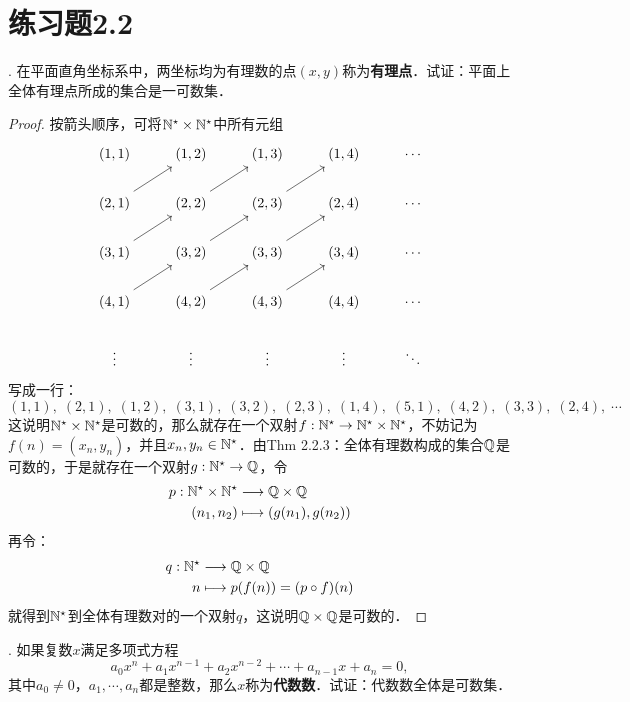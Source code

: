 \section*{练习题2.2}
. 在平面直角坐标系中，两坐标均为有理数的点$(x,y)$称为{\bfseries{有理点}}．试证：平面上全体有理点所成的集合是一可数集．

\begin{proof}
按箭头顺序，可将$\mathbb{N}^\star \times \mathbb{N}^\star$中所有元组
    \begin{equation}
        \begin{tikzcd}
            (1,1) & (1,2) & (1,3) & (1,4) & \cdots \\
            (2,1) \arrow[ur] & (2,2) \arrow[ur] & (2,3) \arrow[ur] & (2,4) & \cdots \\
            (3,1) \arrow[ur] & (3,2) \arrow[ur] & (3,3) \arrow[ur] & (3,4) & \cdots \\
            (4,1) \arrow[ur] & (4,2) \arrow[ur] & (4,3) \arrow[ur] & (4,4) & \cdots \\
            \vdots & \vdots & \vdots & \vdots & \ddots
        \end{tikzcd}
    \end{equation}
写成一行：
\begin{equation}
    (1,1), \; (2,1), \; (1,2), \; (3,1), \; (3,2), \; (2,3), \; (1,4), \; (5,1), \; (4,2), \; (3,3), \; (2,4), \; \cdots
\end{equation}
这说明$\mathbb{N}^\star \times \mathbb{N}^\star$是可数的，那么就存在一个双射$f: \mathbb{N}^\star \to \mathbb{N}^\star \times \mathbb{N}^\star$，不妨记为$f(n) = (x_n, y_n)$，并且$x_n, y_n \in \mathbb{N}^\star$．由Thm 2.2.3：全体有理数构成的集合$\mathbb{Q}$是可数的，于是就存在一个双射$g: \mathbb{N}^\star \to \mathbb{Q}$，令
\begin{align}
    p: \mathbb{N}^\star \times \mathbb{N}^\star &\longrightarrow \mathbb{Q} \times \mathbb{Q} \\
    (n_1, n_2) &\longmapsto (g(n_1), g(n_2))
\end{align}
再令：
\begin{align}
    q: \mathbb{N}^\star &\longrightarrow \mathbb{Q} \times \mathbb{Q} \\
    n &\longmapsto p(f(n)) = (p \circ f) (n)
\end{align}
就得到$\mathbb{N}^\star$到全体有理数对的一个双射$q$，这说明$\mathbb{Q} \times \mathbb{Q}$是可数的．
\end{proof}

. 如果复数$x$满足多项式方程
\begin{equation}
    a_0 x^n + a_1 x^{n-1} + a_2 x^{n-2} + \cdots + a_{n-1} x + a_{n} = 0,
\end{equation}
其中$a_0 \neq 0$，$a_1, \cdots, a_n$都是整数，那么$x$称为{\bfseries{代数数}}．试证：代数数全体是可数集．

